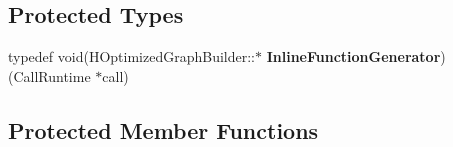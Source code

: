 \subsection*{Protected Types}
\begin{DoxyCompactItemize}
\item 
\hypertarget{classv8_1_1internal_1_1_h_optimized_graph_builder_a1f947430a0d15bcd4bedf48c85bb4eb9}{}typedef void(H\+Optimized\+Graph\+Builder\+::$\ast$ {\bfseries Inline\+Function\+Generator}) (Call\+Runtime $\ast$call)\label{classv8_1_1internal_1_1_h_optimized_graph_builder_a1f947430a0d15bcd4bedf48c85bb4eb9}

\end{DoxyCompactItemize}
\subsection*{Protected Member Functions}
